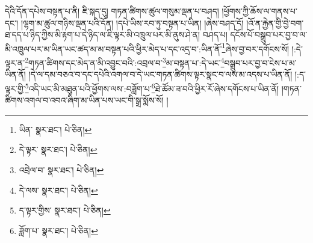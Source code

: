 དེའི་དོན་དཔེས་བསྟན་པ་ནི། ཇི་སྐད་དུ། གཏན་ཚིགས་ཚུལ་གསུམ་ལྡན་པ་བཤད། །ཕྱོགས་ཀྱི་ཆོས་ལ་གནས་པ་དང་། །ལྷག་མ་ཚུལ་གཉིས་ལྡན་པའི་དོན། །དཔེ་ཡིས་རབ་ཏུ་བསྟན་པ་ཡིན། །ཞེས་བཤད་དོ། །འོ་ན་རྐྱེན་གྱི་བྱེ་བག་ཐ་དད་པ་ཉིད་ཀྱིས་མི་རྟག་པ་དེ་ཉིད་ལ་ཇི་ལྟར་མི་འཁྲུལ་པར་མི་ནུས་ཤེ་ན། བཤད་པ། དངོས་པོ་བསྒྲུབ་པར་བྱ་བ་ལ་མི་འཁྲུལ་པར་མ་ཡིན་ཡང་ཚད་མ་མ་བསྟན་པའི་ཕྱིར་མེད་པ་དང་འདྲ་བ་:ཡིན་ནོ་\footnote{ཡིན་  སྣར་ཐང་།  པེ་ཅིན། }ཞེས་བྱ་བར་དགོངས་སོ། །:དེ་ལྟར་ན་\footnote{དེ་ལྟར་  སྣར་ཐང་།  པེ་ཅིན། }གཏན་ཚིགས་དང་མེད་ན་མི་འབྱུང་བའི་:འབྲལ་བ་\footnote{འབྲེལ་བ་  སྣར་ཐང་།  པེ་ཅིན། }མ་བསྟན་པ་:དེ་ཡང་\footnote{དེ་ལས་  སྣར་ཐང་།  པེ་ཅིན། }བསྒྲུབ་པར་བྱ་བ་ངེས་པ་མ་ཡིན་ནོ། །དེ་ལ་དམ་བཅའ་བ་དང་དཔེའི་འགལ་བ་དེ་ཡང་གཏན་ཚིགས་ལྟར་སྣང་བ་ལས་མ་འདས་པ་ཡིན་ནོ། །:ད་ལྟར་གྱི་\footnote{ད་ལྟར་གྱིས་  སྣར་ཐང་།  པེ་ཅིན། }འདི་ཡང་མི་མཐུན་པའི་ཕྱོགས་ལས་:བཟློག་པ་\footnote{ཟློག་པ་  སྣར་ཐང་།  པེ་ཅིན། }ཐེ་ཚོམ་ཟ་བའི་ཕྱིར་རོ་ཞེས་དགོངས་པ་ཡིན་ནོ། །གཏན་ཚིགས་འགལ་བ་འབའ་ཞིག་མ་ཡིན་པས་ཡང་གི་སྒྲ་སྨོས་སོ། །
